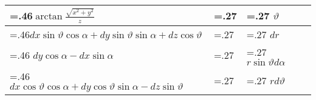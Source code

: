 \begin{tabularx}{0.45\textwidth}{>{\hsize=.46\hsize}X|>{\hsize=.27\hsize}X|>{\hsize=.27\hsize}X}
    \hline
    $\arctan \frac{\sqrt{x^{2}+y^{2}}}{z}$                                             &                 & $\vartheta$                    \\
    \hline
    $d x \sin \vartheta \cos \alpha+d y \sin \vartheta \sin \alpha+d z \cos \vartheta$ &                 & $dr$                           \\
    \hline
    $d y \cos \alpha-d x \sin \alpha$                                                  &                 & $r \sin \vartheta d \alpha$    \\
    \hline
    $d x \cos \vartheta \cos \alpha+d y \cos \vartheta \sin \alpha-d z \sin \vartheta$ &                 & $r d \vartheta$                \\
\end{tabularx}